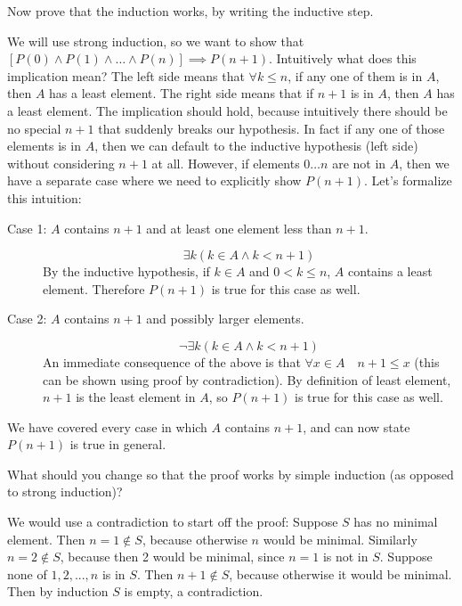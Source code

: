\begin{questions}
\item Now prove that the induction works, by writing the inductive step. 
\begin{solution}[2in]
We will use strong induction, so we want to show that $[P(0) \land P(1) 
\land \ldots \land P(n)] \implies P(n+1)$. Intuitively what does this 
implication mean? The left side means that $\forall k \leq n$, if any 
one of them is in $A$, then $A$ has a least element. The right side 
means that if $n+1$ is in $A$, then $A$ has a least element. The 
implication should hold, because intuitively there should be no special 
$n+1$ that suddenly breaks our hypothesis. In fact if any one of those 
elements is in $A$, then we can default to the inductive hypothesis 
(left side) without considering $n+1$ at all. However, if elements $0 
\ldots n$ are not in $A$, then we have a separate case where we need 
to explicitly show $P(n+1)$. Let's formalize this intuition:
\begin{description}
\item[Case 1: $A$ contains $n+1$ and at least one element less than $n+1$.]
$$
\exists k (k \in A \land k < n+1)
$$
By the inductive hypothesis, if $k \in A$ and $0 < k \leq n$, $A$ 
contains a least element. Therefore $P(n+1)$ is true for this case as well.
\item[Case 2: $A$ contains $n+1$ and possibly larger elements.] 
$$
\lnot \exists k (k \in A \land k < n+1)
$$
An immediate consequence of the above is that $\forall x \in A\quad n+1 
\leq x$ (this can be shown using proof by contradiction). By definition 
of least element, $n+1$ is the least element in $A$, so $P(n+1)$ is true 
for this case as well.
\end{description}
We have covered every case in which $A$ contains $n+1$, and can now 
state $P(n+1)$ is true in general.
\end{solution}

\item What should you change so that the proof works by simple 
induction (as opposed to strong induction)?
\begin{solution}
We would use a contradiction to start off the proof: Suppose $S$ has 
no minimal element. Then $n=1 \not \in S$, because otherwise $n$ would 
be minimal. Similarly $n=2 \not \in S$, because then 2 would be minimal, 
since $n=1$ is not in $S$. Suppose none of $1,2,...,n$ is in $S$. Then 
$n+1\not \in S$, because otherwise it would be minimal. Then by induction 
$S$ is empty, a contradiction.
\end{solution}
\end{questions}